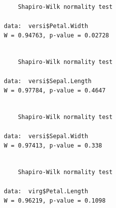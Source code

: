 \documentclass[
  letterpaper,
  DIV=11,
  numbers=noendperiod]{scrartcl}
\newenvironment{Shaded}{\begin{snugshade}}{\end{snugshade}}
\newcommand{\CommentTok}[1]{\textcolor[rgb]{0.37,0.37,0.37}{#1}}
\newcommand{\FunctionTok}[1]{\textcolor[rgb]{0.28,0.35,0.67}{#1}}
\newcommand{\NormalTok}[1]{\textcolor[rgb]{0.00,0.23,0.31}{#1}}
\newcommand{\SpecialCharTok}[1]{\textcolor[rgb]{0.37,0.37,0.37}{#1}}
\begin{document}
\begin{verbatim}

    Shapiro-Wilk normality test

data:  versi$Petal.Width
W = 0.94763, p-value = 0.02728
\end{verbatim}

\begin{Shaded}
\end{Shaded}

\begin{verbatim}

    Shapiro-Wilk normality test

data:  versi$Sepal.Length
W = 0.97784, p-value = 0.4647
\end{verbatim}

\begin{Shaded}
\end{Shaded}

\begin{verbatim}

    Shapiro-Wilk normality test

data:  versi$Sepal.Width
W = 0.97413, p-value = 0.338
\end{verbatim}

\begin{Shaded}
\end{Shaded}

\begin{verbatim}

    Shapiro-Wilk normality test

data:  virg$Petal.Length
W = 0.96219, p-value = 0.1098
\end{verbatim}

\begin{Shaded}
\end{Shaded}
\end{document}
